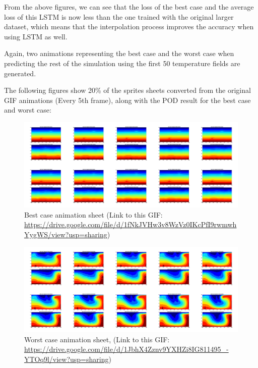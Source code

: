 From the above figures, we can see that the loss of the best case and the average loss of this LSTM is now less than the one trained with the  original larger dataset, which means that the interpolation process improves the accuracy when using LSTM as well.

Again, two animations representing the best case and the worst case when predicting the rest of the simulation using the first 50 temperature fields are generated.

The following figures show 20\% of the sprites sheets converted from the original GIF animations (Every 5th frame), along with the POD result for the best case and worst case:

\begin{figure}[H]
    \centering
    \caption{Best case animation sheet (Link to this GIF: \url{https://drive.google.com/file/d/1fNkJVHw3v8WzVz0IKcPfI9rwmwhYygWS/view?usp=sharing})}
    \includegraphics[scale=0.10]{Report LaTeX/figures/mantle_convection_images/larger_dataset_interpolated/LSTM_Best_GIF_sheet.png}
\end{figure}

\begin{figure}[H]
    \centering
    \caption{Worst case animation sheet, (Link to this GIF: 
    \url{https://drive.google.com/file/d/1JbhX4Zznv9YXHZi8IG811495_-YTOq9l/view?usp=sharing})}
    \includegraphics[scale=0.10]{Report LaTeX/figures/mantle_convection_images/larger_dataset_interpolated/LSTM_Worst_GIF_sheet.png}
\end{figure}


